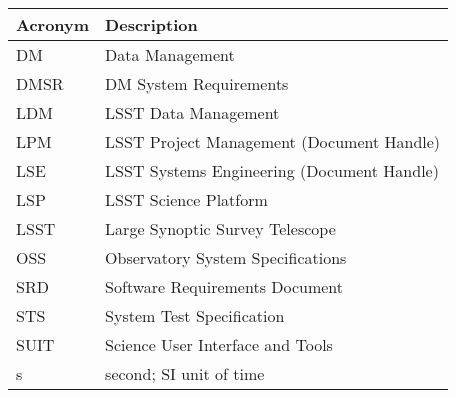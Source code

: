 \addtocounter{table}{-1}
\begin{longtable}{|l|p{}|}\hline
\textbf{Acronym} & \textbf{Description}  \\\hline

DM & Data Management \\\hline
DMSR & DM System Requirements \\\hline
LDM & LSST Data Management \\\hline
LPM & LSST Project Management (Document Handle) \\\hline
LSE & LSST Systems Engineering (Document Handle) \\\hline
LSP & LSST Science Platform \\\hline
LSST & Large Synoptic Survey Telescope \\\hline
OSS & Observatory System Specifications \\\hline
SRD & Software Requirements Document \\\hline
STS & System Test Specification \\\hline
SUIT & Science User Interface and Tools \\\hline
s & second; SI unit of time \\\hline
\end{longtable}
